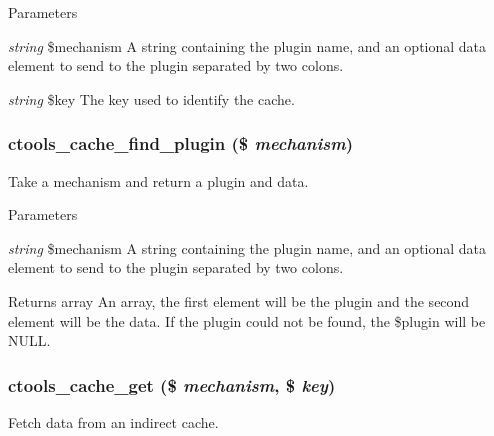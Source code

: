 \begin{DoxyParams}{Parameters}
\item[{\em string}]\$mechanism A string containing the plugin name, and an optional data element to send to the plugin separated by two colons.\item[{\em string}]\$key The key used to identify the cache. \end{DoxyParams}
\hypertarget{profiles_2dosomething_2modules_2contrib_2ctools_2includes_2cache_8inc_ae2a3a4be93449ac5ed9c98c3b40f9004}{
\subsubsection[{ctools\_\-cache\_\-find\_\-plugin}]{\setlength{\rightskip}{0pt plus 5cm}ctools\_\-cache\_\-find\_\-plugin (\$ {\em mechanism})}}
\label{profiles_2dosomething_2modules_2contrib_2ctools_2includes_2cache_8inc_ae2a3a4be93449ac5ed9c98c3b40f9004}
Take a mechanism and return a plugin and data.


\begin{DoxyParams}{Parameters}
\item[{\em string}]\$mechanism A string containing the plugin name, and an optional data element to send to the plugin separated by two colons.\end{DoxyParams}
\begin{DoxyReturn}{Returns}
array An array, the first element will be the plugin and the second element will be the data. If the plugin could not be found, the \$plugin will be NULL. 
\end{DoxyReturn}
\hypertarget{profiles_2dosomething_2modules_2contrib_2ctools_2includes_2cache_8inc_aecf3d4869c6b8eabd5d9be3dfd6d08b2}{
\subsubsection[{ctools\_\-cache\_\-get}]{\setlength{\rightskip}{0pt plus 5cm}ctools\_\-cache\_\-get (\$ {\em mechanism}, \/  \$ {\em key})}}
\label{profiles_2dosomething_2modules_2contrib_2ctools_2includes_2cache_8inc_aecf3d4869c6b8eabd5d9be3dfd6d08b2}
Fetch data from an indirect cache.


